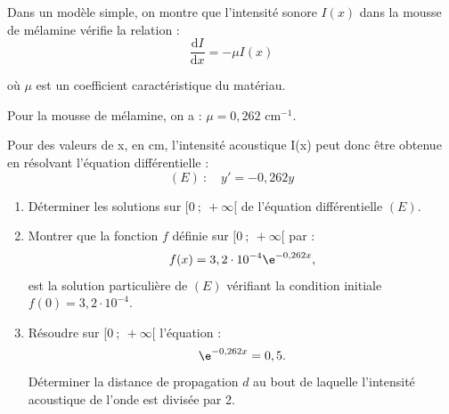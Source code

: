 \medskip

Dans un modèle simple, on montre que l'intensité sonore $I(x)$ dans la mousse de mélamine vérifie la relation :
\[\dfrac{\text{d}I}{\text{d}x} = - \mu  I(x)\]

où $\mu$ est un coefficient caractéristique du matériau.

Pour la mousse de mélamine, on a : 
$\mu = 0,262$ cm$^{-1}$.

Pour des valeurs de x, en cm, l'intensité acoustique I(x) peut donc être obtenue en résolvant l'équation différentielle :
\[(E) \::\quad y'= -0,262y\]

\begin{enumerate}[resume]
\item Déterminer les solutions sur $[0~;~+\infty[$ de l'équation différentielle $(E)$.
\item Montrer que la fonction $f$ définie sur $[0~;~+\infty[$ par :
\[f(x) = 3,2\cdot 10^{-4}\e^{-0,262x},\]
est la solution particulière de $(E)$ vérifiant la condition initiale $f(0) = 3,2\cdot 10^{-4}$.
\item Résoudre sur $[0~;~+\infty[$ l'équation :
\[\e^{-0,262x} =0,5.\]
Déterminer la distance de propagation $d$ au bout de laquelle l'intensité acoustique de l'onde est divisée par 2.
\end{enumerate}

\bigskip
